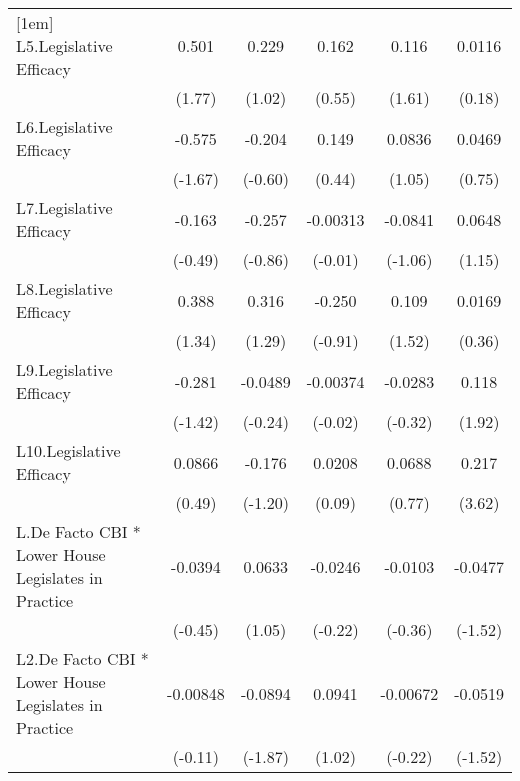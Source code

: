 {\begin{tabular}{l*{5}{c}}
[1em]
L5.Legislative Efficacy&    0.501         &    0.229         &    0.162         &    0.116         &   0.0116         \\
                &   (1.77)         &   (1.02)         &   (0.55)         &   (1.61)         &   (0.18)         \\
[1em]
L6.Legislative Efficacy&   -0.575         &   -0.204         &    0.149         &   0.0836         &   0.0469         \\
                &  (-1.67)         &  (-0.60)         &   (0.44)         &   (1.05)         &   (0.75)         \\
[1em]
L7.Legislative Efficacy&   -0.163         &   -0.257         & -0.00313         &  -0.0841         &   0.0648         \\
                &  (-0.49)         &  (-0.86)         &  (-0.01)         &  (-1.06)         &   (1.15)         \\
[1em]
L8.Legislative Efficacy&    0.388         &    0.316         &   -0.250         &    0.109         &   0.0169         \\
                &   (1.34)         &   (1.29)         &  (-0.91)         &   (1.52)         &   (0.36)         \\
[1em]
L9.Legislative Efficacy&   -0.281         &  -0.0489         & -0.00374         &  -0.0283         &    0.118         \\
                &  (-1.42)         &  (-0.24)         &  (-0.02)         &  (-0.32)         &   (1.92)         \\
[1em]
L10.Legislative Efficacy&   0.0866         &   -0.176         &   0.0208         &   0.0688         &    0.217\sym{***}\\
                &   (0.49)         &  (-1.20)         &   (0.09)         &   (0.77)         &   (3.62)         \\
[1em]
L.De Facto CBI * Lower House Legislates in Practice&  -0.0394         &   0.0633         &  -0.0246         &  -0.0103         &  -0.0477         \\
                &  (-0.45)         &   (1.05)         &  (-0.22)         &  (-0.36)         &  (-1.52)         \\
[1em]
L2.De Facto CBI * Lower House Legislates in Practice& -0.00848         &  -0.0894         &   0.0941         & -0.00672         &  -0.0519         \\
                &  (-0.11)         &  (-1.87)         &   (1.02)         &  (-0.22)         &  (-1.52)         \\

\end{tabular}}

